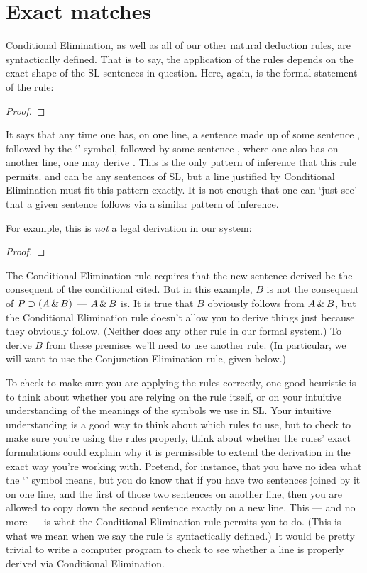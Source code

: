 \section{Exact matches}

Conditional Elimination, as well as all of our other natural deduction rules, are syntactically defined. That is to say, the application of the rules depends on the exact shape of the SL sentences in question. Here, again, is the formal statement of the rule:

\begin{proof}
	\metaA{}
	\metaB{} 
\end{proof}

It says that any time one has, on one line, a sentence made up of some sentence \metaA{}, followed by the `\eif' symbol, followed by some sentence \metaB{}, where one also has \metaA{} on another line, one may derive \metaB{}. This is the only pattern of inference that this rule permits. \metaA{} and \metaB{} can be any sentences of SL, but a line justified by Conditional Elimination must fit this pattern exactly. It is not enough that one can `just see' that a given sentence follows via a similar pattern of inference.

For example, this is \emph{not} a legal derivation in our system:

\begin{proof}
\end{proof}

The Conditional Elimination rule requires that the new sentence derived be the consequent of the conditional cited. But in this example, $B$ is not the consequent of $P\supset (A \,\&\, B)$ --- $A \,\&\, B$ is. It is true that $B$ obviously follows from $A \,\&\, B$, but the Conditional Elimination rule doesn't allow you to derive things just because they obviously follow. (Neither does any other rule in our formal system.) To derive $B$ from these premises we'll need to use another rule. (In particular, we will want to use the Conjunction Elimination rule, given below.)

To check to make sure you are applying the rules correctly, one good heuristic is to think about whether you are relying on the rule itself, or on your intuitive understanding of the meanings of the symbols we use in SL. Your intuitive understanding is a good way to think about which rules to use, but to check to make sure you're using the rules properly, think about whether the rules' exact formulations could explain why it is permissible to extend the derivation in the exact way you're working with. Pretend, for instance, that you have no idea what the `\eif' symbol means, but you do know that if you have two sentences joined by it on one line, and the first of those two sentences on another line, then you are allowed to copy down the second sentence exactly on a new line. This --- and no more --- is what the Conditional Elimination rule permits you to do. (This is what we mean when we say the rule is syntactically defined.) It would be pretty trivial to write a computer program to check to see whether a line is properly derived via Conditional Elimination.


